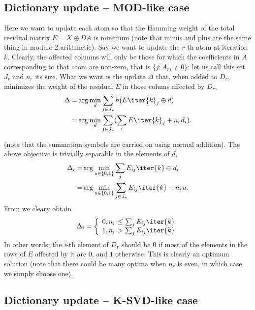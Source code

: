 \documentclass[a4paper]{IEEEtran}
\begin{document}
 \subsection{Dictionary update -- MOD-like case}
 
Here we want to update each atom so that the Hamming weight of the total residual matrix $E = X \oplus DA$ is minimum (note that minus and plus are the same thing in modulo-2 arithmetic). Say we want to update the $r$-th atom at iteration $k$. Clearly, the affected columns will only be those for which the  coefficients in $A$  corresponding to that atom are non-zero, that is $\{j : A_{rj} \neq 0 \}$; let us call this set $J_r$ and $n_r$ its size. What we want is the update $\Delta$ that, when added to $D_r$, minimizes the weight of the residual $E$ in those colums affected by $D_r$,
 \begin{eqnarray}
 \Delta  =& \arg\min_d \sum_{j \in J_r}  h(E\iter{k}_j \oplus d) \\
 =& \arg\min_d \sum_{j \in J_r} (\sum_i E\iter{k}_j + n_r d_i).
\label{eq:bdu2}
 \end{eqnarray}

(note that the summation symbols are carried on using normal addition). The above objective is trivially separable in the elements of $d$,
 \begin{eqnarray}
 \Delta_i  =& \arg\min_{u \in \{0,1\}} \sum_j E_{ij}\iter{k} \oplus d_i\\
 =& \arg\min_{u \in \{0,1\}} \sum_{j\in J_r} E_{ij}\iter{k} + n_r u.
\label{eq:bdu3}
 \end{eqnarray}
From  we cleary obtain 
\begin{equation}
\Delta_i = \left\{
\begin{array}{cl}
0, n_r \leq  \sum_j E_{ij}\iter{k} \\
1, n_r > \sum_j E_{ij}\iter{k}
\end{array}
\right. 
\label{eq:bdu4}
\end{equation}
In other words, the $i$-th element of $D_r$ should be $0$ if most of the elements in the rows of $E$ affected by it are $0$, and $1$ otherwise. 
This is clearly an optimum solution (note that there could be many optima  when $n_r$ is even, in which case we simply choose one).

\subsection{Dictionary update -- K-SVD-like case}
\end{document}
